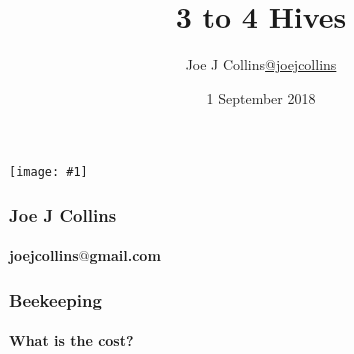 \documentclass{beamer}
\title{3 to 4 Hives}
\author{Joe J Collins\newline\href{https://twitter.com/joejcollins}{@joejcollins}}
\institute{Shropshire Beekeepers Association}
\date{1 September 2018}
\newcommand{\bigpicture}[1]{%
  \begin{list}{}{%
    \vspace*{-0.58cm}%
    \setlength{\topsep}{-0pt}%
    \setlength{\leftmargin}{-1.3cm}%
    \setlength{\rightmargin}{0pt}%
    \setlength{\listparindent}{\parindent}%
    \setlength{\itemindent}{\parindent}%
    \setlength{\parsep}{\parskip}%
  }%
  \item[]%
  \vspace*{\fill}
    \texttt{[image: \#1]}%
  \vspace*{\fill}
  \end{list}%
}%
\begin{document}
\begin{frame}
\bigpicture{../Assets/BbcTestCard.jpg}
\end{frame}

\frame{\titlepage}

\begin{frame}
\frametitle{Joe J Collins}
\framesubtitle{joejcollins$@$gmail.com}

\note{}
\end{frame}

\begin{frame}
\frametitle{Beekeeping}
\framesubtitle{What is the cost?}
\begin{center}

\end{center}
\end{frame}
\end{document}
